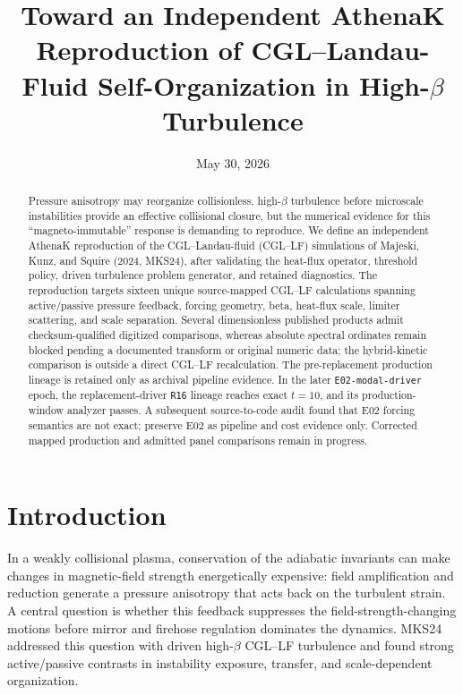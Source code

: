 \documentclass[11pt]{article}
\title{Toward an Independent AthenaK Reproduction of CGL--Landau-Fluid
Self-Organization in High-\(\beta\) Turbulence}
\author{}
\date{May 30, 2026}
\begin{document}
\maketitle

\begin{abstract}
Pressure anisotropy may reorganize collisionless, high-\(\beta\) turbulence
before microscale instabilities provide an effective collisional closure, but
the numerical evidence for this ``magneto-immutable'' response is demanding
to reproduce.  We define an independent AthenaK reproduction of the
CGL--Landau-fluid (CGL--LF) simulations of Majeski, Kunz, and Squire (2024,
MKS24), after validating the heat-flux operator, threshold policy, driven
turbulence problem generator, and retained diagnostics.  The reproduction
targets sixteen unique source-mapped CGL--LF calculations spanning
active/passive pressure feedback, forcing geometry, beta, heat-flux scale,
limiter scattering, and scale separation.  Several dimensionless published
products admit checksum-qualified digitized comparisons, whereas absolute
spectral ordinates remain blocked pending a documented transform or original
numeric data; the hybrid-kinetic comparison is outside a direct CGL--LF
recalculation.  The pre-replacement production lineage is retained only as
archival pipeline evidence.  In the later \texttt{E02-modal-driver} epoch,
the replacement-driver \texttt{R16} lineage reaches exact \(t=10\), and its
production-window analyzer passes.  A subsequent source-to-code audit found
that E02 forcing semantics are not exact; preserve E02 as pipeline and cost
evidence only.  Corrected mapped production and admitted panel comparisons
remain in progress.
\end{abstract}

\section{Introduction}

In a weakly collisional plasma, conservation of the adiabatic invariants can
make changes in magnetic-field strength energetically expensive: field
amplification and reduction generate a pressure anisotropy that acts back on
the turbulent strain.  A central question is whether this feedback suppresses
the field-strength-changing motions before mirror and firehose regulation
dominates the dynamics.  MKS24 addressed this question with driven
high-\(\beta\) CGL--LF turbulence and found strong active/passive contrasts in
instability exposure, transfer, and scale-dependent organization.
\end{document}

